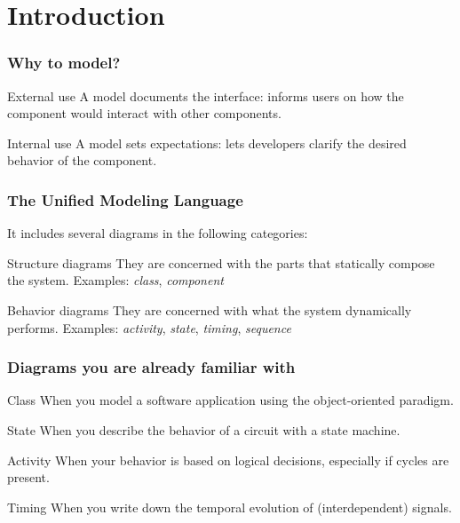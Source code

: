 \section{Introduction}

\begin{frame}
\frametitle{Why to model?}

\begin{block}{External use}
A model documents the interface: informs users on how the component would interact with other components.
\end{block}
\pause
\begin{block}{Internal use}
A model sets expectations: lets developers clarify the desired behavior of the component.
\end{block}
\end{frame}

\begin{frame}
\frametitle{The Unified Modeling Language}
It includes several diagrams in the following categories:
\begin{block}{Structure diagrams}
They are concerned with the parts that statically compose the system.
Examples: {\em class}, {\em component}
\end{block}
\pause
\begin{block}{Behavior diagrams}
They are concerned with what the system dynamically performs.
Examples: {\em activity}, {\em state}, {\em timing}, {\em sequence}
\end{block}
\end{frame}

\begin{frame}
\frametitle{Diagrams you are already familiar with}

\begin{block}{Class}
When you model a software application using the object-oriented paradigm.
\end{block}
\begin{block}{State}
When you describe the behavior of a circuit with a state machine.
\end{block}
\begin{block}{Activity}
When your behavior is based on logical decisions, especially if cycles are present.
\end{block}
\begin{block}{Timing}
When you write down the temporal evolution of (interdependent) signals.
\end{block}
\end{frame}

